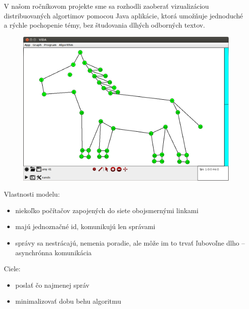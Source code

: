 
V našom ročníkovom projekte sme sa rozhodli zaoberať vizualizáciou distribuovaných algortimov
pomocou Java aplikácie, ktorá umožňuje jednoduché a rýchle pochopenie témy, bez
študovania dlhých odborných textov.

\begin{figure}
\includegraphics[width=\columnwidth]{konik}
\end{figure}


Vlastnosti modelu:
\begin{itemize}
    \item niekoľko počítačov zapojených do siete obojsmernými linkami
    \item majú jednoznačné id, komunikujú len správami
    \item správy sa nestrácajú, nemenia poradie, ale môže im to trvať ľubovoľne dlho -- asynchrónna
    komunikácia
\end{itemize}

Ciele:
\begin{itemize}
    \item poslať čo najmenej správ
    \item minimalizovať dobu behu algoritmu
\end{itemize}

